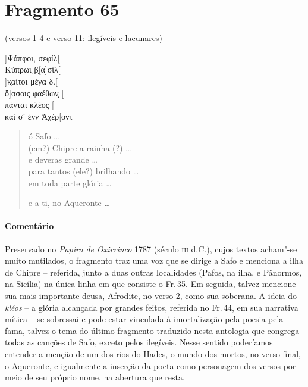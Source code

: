 \pagebreak


\section{Fragmento 65}

\begin{gkverse}
\textnormal{(versos 1-4 e verso 11: ilegíveis e lacunares)}

]Ψάπφοι, σεφίλ[\\
Κύπρωι ̣β̣[α]σίλ[\\
]κ̣αίτοι μέγα δ.[\\
ὄ]σσοις φαέθων̣ [\\
πάνται κλέος [\\
καί σ’ ἐνν Ἀχέρ[οντ 
\end{gkverse}

\begin{verse}
ó Safo \ldots{}\\
(em?) Chipre a rainha (?) \ldots{}\\
e deveras grande \ldots{}\\
para tantos (ele?) brilhando \ldots{}\\
em toda parte glória \ldots{}

e a ti, no Aqueronte \ldots{}\\
\end{verse}

{\paragraph{Comentário} Preservado no \textit{Papiro de Oxirrinco} 1787  (século \textsc{iii} d.C.), cujos textos acham"-se muito mutilados, o fragmento traz uma voz que se dirige a Safo e menciona a ilha de Chipre -- referida, junto a duas outras localidades (Pafos, na ilha, e Pânormos, na Sicília) na única linha em que consiste o Fr.\,35. Em seguida, talvez mencione sua mais importante deusa, Afrodite, no verso 2, como sua soberana. A ideia do \textit{kléos} -- a glória alcançada por grandes feitos, referida no Fr.\,44, em sua narrativa mítica -- se sobressai e pode estar vinculada à imortalização pela poesia pela fama, talvez o tema do último fragmento traduzido nesta antologia que congrega todas as canções de Safo, exceto pelos ilegíveis. Nesse sentido poderíamos entender a menção de um dos rios do Hades, o mundo dos mortos, no verso final, o Aqueronte, e igualmente a inserção da poeta como personagem dos versos por meio de seu próprio nome, na abertura que resta.}

